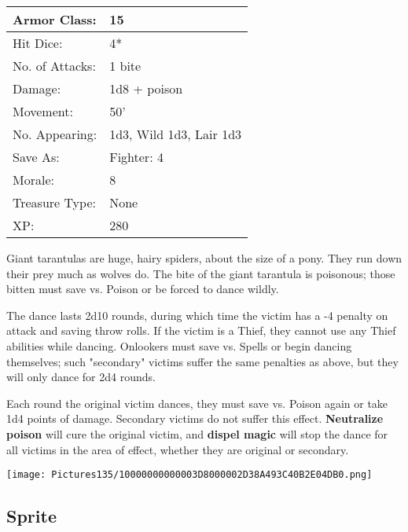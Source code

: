 \documentclass[a4paper,twoside,openany,10pt]{book}
\begin{document}
\begin{multicols}{2}
\begin{tabularx}{0.50\textwidth}{@{}lX@{}}
Armor Class: & 15 \\\hline
Hit Dice: & 4* \\\hline
No. of Attacks: & 1 bite \\\hline
Damage: & 1d8 + poison \\\hline
Movement: & 50' \\\hline
No. Appearing: & 1d3, Wild 1d3, Lair 1d3 \\\hline
Save As: & Fighter: 4 \\\hline
Morale: & 8 \\\hline
Treasure Type: & None \\\hline
XP: & 280 \\\hline
\end{tabularx}\medskip

Giant tarantulas are huge, hairy spiders, about the size of a pony. They run down their prey much as wolves do. The bite of the giant tarantula is poisonous; those bitten must save vs. Poison or be forced to dance wildly. 

The dance lasts 2d10 rounds, during which time the victim has a -4 penalty on attack and saving throw rolls. If the victim is a Thief, they cannot use any Thief abilities while dancing. Onlookers must save vs. Spells or begin dancing themselves; such "secondary" victims suffer the same penalties as above, but they will only dance for 2d4 rounds.

Each round the original victim dances, they must save vs. Poison again or take 1d4 points of damage. Secondary victims do not suffer this effect. \textbf{Neutralize poison} will cure the original victim, and \textbf{dispel magic} will stop the dance for all victims in the area of effect, whether they are original or secondary.

\vfill

\begin{center} \texttt{[image: Pictures135/10000000000003D8000002D38A493C40B2E04DB0.png]} \end{center}

\columnbreak

\subsection*{Sprite}\label{sprite}


\end{multicols}
\end{document}
